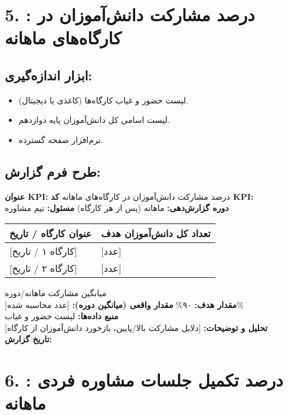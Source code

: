 \documentclass[11pt]{article}
\begin{document}
\hrulefill
\bigskip

\section*{5. : درصد مشارکت دانش‌آموزان در کارگاه‌های ماهانه}

\subsection*{ابزار اندازه‌گیری:}
\begin{itemize}
    \item لیست حضور و غیاب کارگاه‌ها (کاغذی یا دیجیتال).
    \item لیست اسامی کل دانش‌آموزان پایه دوازدهم.
    \item نرم‌افزار صفحه گسترده.
\end{itemize}

\subsection*{طرح فرم گزارش:}
\noindent\textbf{عنوان KPI:} درصد مشارکت دانش‌آموزان در کارگاه‌های ماهانه \hfill \textbf{کد KPI:}  \\
\noindent\textbf{دوره گزارش‌دهی:} ماهانه (پس از هر کارگاه) \hfill \textbf{مسئول:} تیم مشاوره \\

\bigskip
\begin{tabular}{ll}
\textbf{عنوان کارگاه / تاریخ} & \textbf{تعداد کل دانش‌آموزان هدف} \\ %
\hline
{[کارگاه ۱ / تاریخ]} & {[عدد]} \\
{[کارگاه ۲ / تاریخ]} & {[عدد]} \\
\end{tabular}
\bigskip

\noindent میانگین مشارکت ماهانه/دوره \\
\noindent\textbf{مقدار هدف:} ۹۰\% \hfill \textbf{مقدار واقعی (میانگین دوره):} {[عدد محاسبه شده]\%} \\
\noindent\textbf{منبع داده‌ها:} لیست حضور و غیاب \\
\noindent\textbf{تحلیل و توضیحات:} {[دلایل مشارکت بالا/پایین، بازخورد دانش‌آموزان از کارگاه]} \\
\noindent\textbf{تاریخ گزارش:} \\

\hrulefill
\bigskip

\section*{6. : درصد تکمیل جلسات مشاوره فردی ماهانه}
\end{document}
